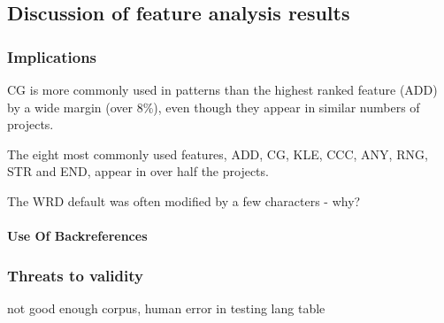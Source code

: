 \subsection{Discussion of feature analysis results}
\label{sec:featureDiscussion}

\subsubsection{Implications}
CG is more commonly used in patterns than the highest ranked feature (ADD) by a wide margin (over 8\%), even though they appear in similar numbers of projects.

The eight most commonly used features, ADD, CG, KLE, CCC, ANY, RNG, STR and END,
appear in over half the projects.

The WRD default was often modified by a few characters - why?

\paragraph{Use Of Backreferences}

\subsubsection{Threats to validity}
not good enough corpus, human error in testing lang table

